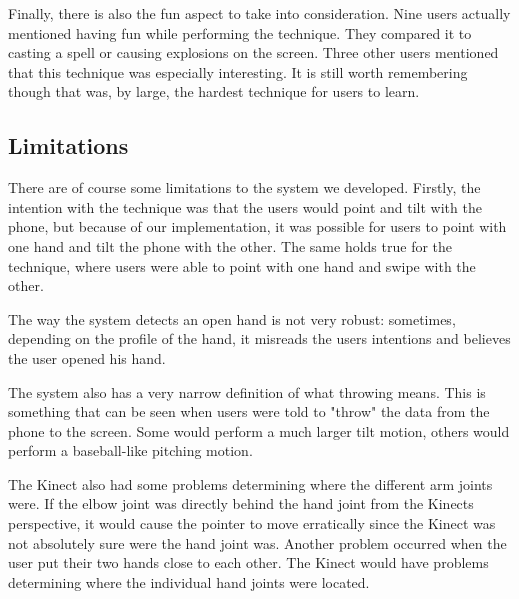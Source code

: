 Finally, there is also the fun aspect to take into consideration. Nine users actually mentioned having fun while performing the \pinch technique. 
They compared it to casting a spell or causing explosions on the screen. Three other users mentioned that this technique was especially interesting. 
It is still worth remembering though that \pinch was, by large, the hardest technique for users to learn. 



\subsection{Limitations}
There are of course some limitations to the system we developed. 
Firstly, the intention with the \tilt technique was that the users would point and tilt with the phone, but because of our implementation, it was possible for users to point with one hand and tilt the phone with the other.
The same holds true for the \swipe technique, where users were able to point with one hand and swipe with the other.

The way the system detects an open hand is not very robust: sometimes, depending on the profile of the hand, it misreads the users intentions and believes the user opened his hand. 

The system also has a very narrow definition of what throwing means. 
This is something that can be seen when users were told to "throw" the data from the phone to the screen.
Some would perform a much larger tilt motion, others would perform a baseball-like pitching motion. 

The Kinect also had some problems determining where the different arm joints were.
If the elbow joint was directly behind the hand joint from the Kinects perspective, it would cause the pointer to move erratically since the Kinect was not absolutely sure were the hand joint was.
Another problem occurred when the user put their two hands close to each other. 
The Kinect would have problems determining where the individual hand joints were located. 
